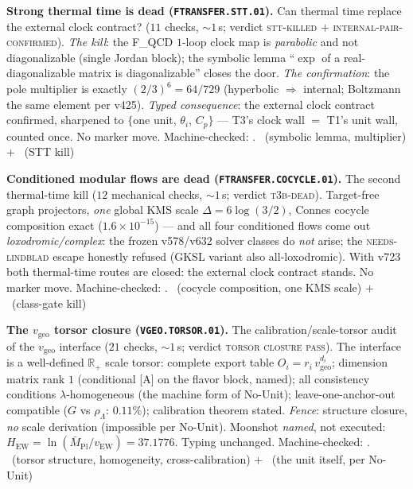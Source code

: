 \documentclass[11pt,a4paper]{article}
\newcommand{\Mbar}{\bar M_{\mathrm{Pl}}}
\theoremstyle{definition}
\begin{document}
\par\smallskip\noindent\textbf{Strong thermal time is dead
(\texttt{FTRANSFER.STT.01}).}
Can thermal time replace the external clock contract? ($11$ checks,
${\sim}1$\,s; verdict \textsc{stt-killed} $+$
\textsc{internal-pair-confirmed}).  \emph{The kill}: the F\_QCD
$1$-loop clock map is \emph{parabolic} and not diagonalizable
(single Jordan block); the symbolic lemma ``$\exp$ of a
real-diagonalizable matrix is diagonalizable'' closes the door.
\emph{The confirmation}: the pole multiplier is exactly
$(2/3)^6=64/729$ (hyperbolic $\Rightarrow$ internal; Boltzmann the
same element per v425).  \emph{Typed consequence}: the external
clock contract confirmed, sharpened to $\{$one unit, $\theta_i$,
$C_p\}$ --- T3's clock wall $=$ T1's unit wall, counted once.  No
marker move.
Machine-checked: .
\mE\ (symbolic lemma, multiplier) $+$ \mX\ (STT kill)
\par\smallskip

\par\smallskip\noindent\textbf{Conditioned modular flows are dead
(\texttt{FTRANSFER.COCYCLE.01}).}
The second thermal-time kill ($12$ mechanical checks, ${\sim}1$\,s;
verdict \textsc{t3b-dead}).  Target-free graph projectors, \emph{one}
global KMS scale $\Delta=6\log(3/2)$, Connes cocycle composition
exact ($1.6\times10^{-15}$) --- and all four conditioned flows come
out \emph{loxodromic/complex}: the frozen v578/v632 solver classes
do \emph{not} arise; the \textsc{needs-lindblad} escape honestly
refused (GKSL variant also all-loxodromic).  With v723 both
thermal-time routes are closed: the external clock contract stands.
No marker move.
Machine-checked: .
\mE\ (cocycle composition, one KMS scale) $+$ \mX\ (class-gate kill)
\par\smallskip

\par\smallskip\noindent\textbf{The $v_{\mathrm{geo}}$ torsor closure
(\texttt{VGEO.TORSOR.01}).}
The calibration/scale-torsor audit of the $v_{\mathrm{geo}}$
interface ($21$ checks, ${\sim}1$\,s; verdict \textsc{torsor closure
pass}).  The interface is a well-defined $\mathbb R_+$ scale torsor:
complete export table $O_i=r_i\,v_{\mathrm{geo}}^{d_i}$; dimension
matrix rank $1$ (conditional [A] on the flavor block, named); all
consistency conditions $\lambda$-homogeneous (the machine form of
No-Unit); leave-one-anchor-out compatible ($G$ vs $\rho_\Lambda$:
$0.11\%$); calibration theorem stated.  \emph{Fence}: structure
closure, \emph{no} scale derivation (impossible per No-Unit).
Moonshot \emph{named}, not executed:
$H_{\mathrm{EW}}=\ln(\Mbar/v_{\mathrm{EW}})=37.1776$.  Typing
unchanged.
Machine-checked: .
\mE\ (torsor structure, homogeneity, cross-calibration) $+$ \mO\
(the unit itself, per No-Unit)
\par\smallskip
\end{document}
